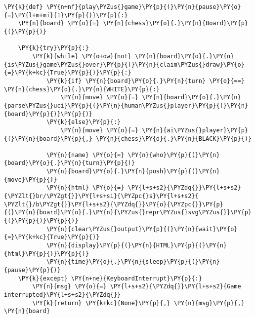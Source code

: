 \bigskip

    \begin{tcolorbox}[fontupper=\linespread{.66}\selectfont, breakable, size=fbox, boxrule=1pt, pad at break*=1mm,colback=cellbackground, colframe=cellborder]
\begin{Verbatim}[commandchars=\\\{\}]
\PY{k}{def} \PY{n+nf}{play\PYZus{}game}\PY{p}{(}\PY{n}{pause}\PY{o}{=}\PY{l+m+mi}{1}\PY{p}{)}\PY{p}{:}
    \PY{n}{board} \PY{o}{=} \PY{n}{chess}\PY{o}{.}\PY{n}{Board}\PY{p}{(}\PY{p}{)}
    
    \PY{k}{try}\PY{p}{:}
        \PY{k}{while} \PY{o+ow}{not} \PY{n}{board}\PY{o}{.}\PY{n}{is\PYZus{}game\PYZus{}over}\PY{p}{(}\PY{n}{claim\PYZus{}draw}\PY{o}{=}\PY{k+kc}{True}\PY{p}{)}\PY{p}{:}
            \PY{k}{if} \PY{n}{board}\PY{o}{.}\PY{n}{turn} \PY{o}{==} \PY{n}{chess}\PY{o}{.}\PY{n}{WHITE}\PY{p}{:}
                \PY{n}{move} \PY{o}{=} \PY{n}{board}\PY{o}{.}\PY{n}{parse\PYZus{}uci}\PY{p}{(}\PY{n}{human\PYZus{}player}\PY{p}{(}\PY{n}{board}\PY{p}{)}\PY{p}{)}
            \PY{k}{else}\PY{p}{:}
                \PY{n}{move} \PY{o}{=} \PY{n}{ai\PYZus{}player}\PY{p}{(}\PY{n}{board}\PY{p}{,} \PY{n}{chess}\PY{o}{.}\PY{n}{BLACK}\PY{p}{)}
                
            \PY{n}{name} \PY{o}{=} \PY{n}{who}\PY{p}{(}\PY{n}{board}\PY{o}{.}\PY{n}{turn}\PY{p}{)}
            \PY{n}{board}\PY{o}{.}\PY{n}{push}\PY{p}{(}\PY{n}{move}\PY{p}{)}
            \PY{n}{html} \PY{o}{=} \PY{l+s+s2}{\PYZdq{}}\PY{l+s+s2}{\PYZlt{}br/\PYZgt{}}\PY{l+s+si}{\PYZpc{}s}\PY{l+s+s2}{ \PYZlt{}/b\PYZgt{}}\PY{l+s+s2}{\PYZdq{}}\PY{o}{\PYZpc{}}\PY{p}{(}\PY{n}{board}\PY{o}{.}\PY{n}{\PYZus{}repr\PYZus{}svg\PYZus{}}\PY{p}{(}\PY{p}{)}\PY{p}{)}
            \PY{n}{clear\PYZus{}output}\PY{p}{(}\PY{n}{wait}\PY{o}{=}\PY{k+kc}{True}\PY{p}{)}
            \PY{n}{display}\PY{p}{(}\PY{n}{HTML}\PY{p}{(}\PY{n}{html}\PY{p}{)}\PY{p}{)}
            \PY{n}{time}\PY{o}{.}\PY{n}{sleep}\PY{p}{(}\PY{n}{pause}\PY{p}{)}
    \PY{k}{except} \PY{n+ne}{KeyboardInterrupt}\PY{p}{:}
        \PY{n}{msg} \PY{o}{=} \PY{l+s+s2}{\PYZdq{}}\PY{l+s+s2}{Game interrupted}\PY{l+s+s2}{\PYZdq{}}
        \PY{k}{return} \PY{k+kc}{None}\PY{p}{,} \PY{n}{msg}\PY{p}{,} \PY{n}{board}
    

\end{Verbatim}
\end{tcolorbox}
